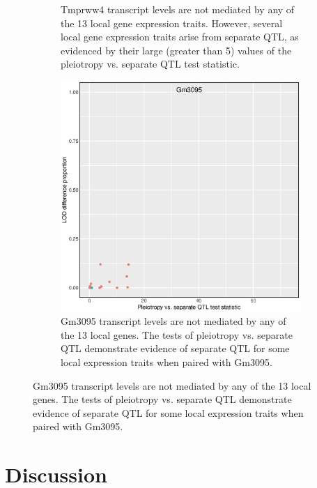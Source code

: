 \documentclass{article}
\begin{document}
\begin{figure}
\begin{subfigure}[t]{.45\textwidth}
        \caption{Tmprww4 transcript levels are not mediated by any of the 13 local gene expression traits. However, several local gene expression traits arise from separate QTL, as evidenced by their large (greater than 5) values of the pleiotropy vs. separate QTL test statistic.}
    \end{subfigure}
    \begin{subfigure}[t]{.45\textwidth}
        \includegraphics[width = \textwidth]{../Rmd/nonlocal-scatter_141.eps}
        \caption{Gm3095 transcript levels are not mediated by any of the 13 local genes. The tests of pleiotropy vs. separate QTL demonstrate evidence of separate QTL for some local expression traits when paired with Gm3095.}
    \end{subfigure}
    \label{fig:my_label}
\end{figure}





\section{Discussion}
\end{document}
